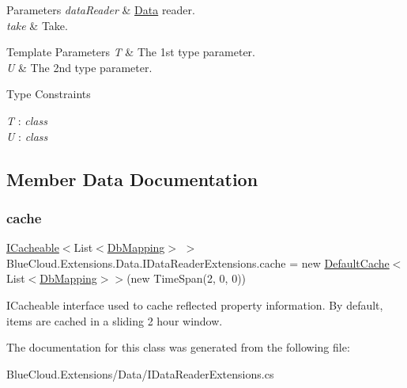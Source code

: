 \begin{DoxyParams}{Parameters}
{\em data\+Reader} & \mbox{\hyperlink{namespace_blue_cloud_1_1_extensions_1_1_data}{Data}} reader.\\
\hline
{\em take} & Take.\\
\hline
\end{DoxyParams}

\begin{DoxyTemplParams}{Template Parameters}
{\em T} & The 1st type parameter.\\
\hline
{\em U} & The 2nd type parameter.\\
\hline
\end{DoxyTemplParams}
\begin{Desc}
\item[Type Constraints]\begin{description}
\item[{\em T} : {\em class}]\item[{\em U} : {\em class}]\end{description}
\end{Desc}


\subsection{Member Data Documentation}
\mbox{\label{class_blue_cloud_1_1_extensions_1_1_data_1_1_i_data_reader_extensions_aec5e45db6160d2502c2eceead22b1a83}} 
\subsubsection{\texorpdfstring{cache}{cache}}
{\footnotesize\ttfamily \mbox{\hyperlink{interface_blue_cloud_1_1_extensions_1_1_cache_1_1_i_cacheable}{I\+Cacheable}}$<$List$<$\mbox{\hyperlink{class_blue_cloud_1_1_extensions_1_1_data_1_1_db_mapping}{Db\+Mapping}}$>$ $>$ Blue\+Cloud.\+Extensions.\+Data.\+I\+Data\+Reader\+Extensions.\+cache = new \mbox{\hyperlink{class_blue_cloud_1_1_extensions_1_1_cache_1_1_default_cache}{Default\+Cache}}$<$List$<$\mbox{\hyperlink{class_blue_cloud_1_1_extensions_1_1_data_1_1_db_mapping}{Db\+Mapping}}$>$$>$(new Time\+Span(2, 0, 0))\hspace{0.3cm}{\ttfamily [static]}}



I\+Cacheable interface used to cache reflected property information. By default, items are cached in a sliding 2 hour window. 



The documentation for this class was generated from the following file\+:\begin{DoxyCompactItemize}
\item 
Blue\+Cloud.\+Extensions/\+Data/I\+Data\+Reader\+Extensions.\+cs\end{DoxyCompactItemize}
